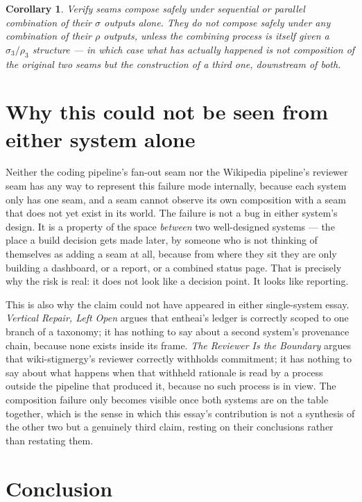 \documentclass[11pt,openany]{book}
\newtheorem{corollary}[proposition]{Corollary}
\begin{document}
\begin{corollary}
Verify seams compose safely under sequential or parallel combination of their $\sigma$ outputs alone. They do not compose safely under any combination of their $\rho$ outputs, unless the combining process is itself given a $\sigma_3/\rho_3$ structure — in which case what has actually happened is not composition of the original two seams but the construction of a third one, downstream of both.
\end{corollary}

\section{Why this could not be seen from either system alone}

Neither the coding pipeline's fan-out seam nor the Wikipedia pipeline's reviewer seam has any way to represent this failure mode internally, because each system only has one seam, and a seam cannot observe its own composition with a seam that does not yet exist in its world. The failure is not a bug in either system's design. It is a property of the space \emph{between} two well-designed systems — the place a build decision gets made later, by someone who is not thinking of themselves as adding a seam at all, because from where they sit they are only building a dashboard, or a report, or a combined status page. That is precisely why the risk is real: it does not look like a decision point. It looks like reporting.

This is also why the claim could not have appeared in either single-system essay. \emph{Vertical Repair, Left Open} argues that entheai's ledger is correctly scoped to one branch of a taxonomy; it has nothing to say about a second system's provenance chain, because none exists inside its frame. \emph{The Reviewer Is the Boundary} argues that wiki-stigmergy's reviewer correctly withholds commitment; it has nothing to say about what happens when that withheld rationale is read by a process outside the pipeline that produced it, because no such process is in view. The composition failure only becomes visible once both systems are on the table together, which is the sense in which this essay's contribution is not a synthesis of the other two but a genuinely third claim, resting on their conclusions rather than restating them.

\section{Conclusion}
\end{document}
